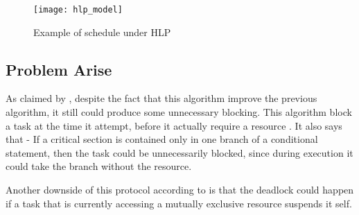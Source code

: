 \begin{figure}[h]
    \centering
    \texttt{[image: hlp\_model]}
    \caption{ Example of schedule under HLP \cite{b6}}
    \label{fig:hlp_model}
\end{figure}


\subsection{Problem Arise}

As claimed by \cite{b5}, despite the fact that this algorithm improve the previous algorithm, it still could produce some unnecessary blocking. This algorithm block a task at the time it attempt, before it actually require a resource \cite{b5}. It also says that - If a critical section is contained only in one branch of a conditional statement, then the task could be unnecessarily blocked, since during execution it could take the branch without the resource.

Another downside of this protocol according to \cite{b6} is that the deadlock could happen if a task that is currently accessing a mutually exclusive resource suspends it self.
 










